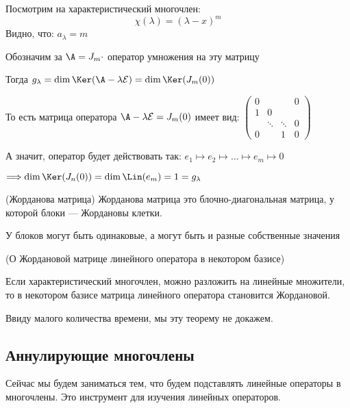 \vspace*{3mm}
Посмотрим на характеристический многочлен:
    \[  \chi(\lambda) = (\lambda - x)^m \]
Видно, что: $ a_{\lambda} = m $

Обозначим за $\A = J_m \cdot$ оператор умножения на эту матрицу

Тогда $ g_{\lambda} = \dim \Ker(\A - \lambda\mathcal{E}) = \dim \Ker(J_{m}(0))$

То есть матрица оператора $\A - \lambda\mathcal{E} = J_{m} (0)$ имеет вид:
$ \left(\begin{array}{cccc}
0 &  &  & 0 \\
1 & 0 &  &  \\
 & \ddots & \ddots & 0 \\ 
0 &  & 1 & 0
\end{array}\right) $

А значит, оператор будет действовать так: $e_1 \mapsto e_2 \mapsto \dots \mapsto e_m \mapsto 0$

$\Longrightarrow \dim \Ker(J_{n}(0)) = \dim \Lin (e_m) = 1 = g_{\lambda}$

\begin{conj}(Жорданова матрица)
    Жорданова матрица это блочно-диагональная матрица, у которой блоки --- Жордановы клетки.

    У блоков могут быть одинаковые, а могут быть и разные собственные значения
\end{conj}

\begin{theorem}(О Жордановой матрице линейного оператора в некотором базисе)

    Если характеристический многочлен, можно разложить на линейные множители,
    то в некотором базисе матрица линейного оператора становится Жордановой.

    Ввиду малого количества времени, мы эту теорему не докажем.
\end{theorem}

\vspace*{5mm}

\subsection*{Аннулирующие многочлены}

Сейчас мы будем заниматься тем, что будем подставлять линейные операторы в многочлены.
Это инструмент для изучения линейных операторов.

\vspace*{3mm}

